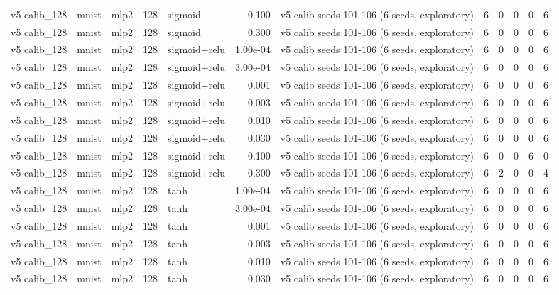 \begin{table}[htbp]
{\begin{tabular}{@{}lllrlrlrrrrr@{}}
v5 calib\_128 & mnist & mlp2 & 128 & sigmoid & 0.100 & v5 calib seeds 101-106 (6 seeds, exploratory) & 6 & 0 & 0 & 0 & 6 \\
v5 calib\_128 & mnist & mlp2 & 128 & sigmoid & 0.300 & v5 calib seeds 101-106 (6 seeds, exploratory) & 6 & 0 & 0 & 0 & 6 \\
v5 calib\_128 & mnist & mlp2 & 128 & sigmoid+relu & 1.00e-04 & v5 calib seeds 101-106 (6 seeds, exploratory) & 6 & 0 & 0 & 0 & 6 \\
v5 calib\_128 & mnist & mlp2 & 128 & sigmoid+relu & 3.00e-04 & v5 calib seeds 101-106 (6 seeds, exploratory) & 6 & 0 & 0 & 0 & 6 \\
v5 calib\_128 & mnist & mlp2 & 128 & sigmoid+relu & 0.001 & v5 calib seeds 101-106 (6 seeds, exploratory) & 6 & 0 & 0 & 0 & 6 \\
v5 calib\_128 & mnist & mlp2 & 128 & sigmoid+relu & 0.003 & v5 calib seeds 101-106 (6 seeds, exploratory) & 6 & 0 & 0 & 0 & 6 \\
v5 calib\_128 & mnist & mlp2 & 128 & sigmoid+relu & 0.010 & v5 calib seeds 101-106 (6 seeds, exploratory) & 6 & 0 & 0 & 0 & 6 \\
v5 calib\_128 & mnist & mlp2 & 128 & sigmoid+relu & 0.030 & v5 calib seeds 101-106 (6 seeds, exploratory) & 6 & 0 & 0 & 0 & 6 \\
v5 calib\_128 & mnist & mlp2 & 128 & sigmoid+relu & 0.100 & v5 calib seeds 101-106 (6 seeds, exploratory) & 6 & 0 & 0 & 6 & 0 \\
v5 calib\_128 & mnist & mlp2 & 128 & sigmoid+relu & 0.300 & v5 calib seeds 101-106 (6 seeds, exploratory) & 6 & 2 & 0 & 0 & 4 \\
v5 calib\_128 & mnist & mlp2 & 128 & tanh & 1.00e-04 & v5 calib seeds 101-106 (6 seeds, exploratory) & 6 & 0 & 0 & 0 & 6 \\
v5 calib\_128 & mnist & mlp2 & 128 & tanh & 3.00e-04 & v5 calib seeds 101-106 (6 seeds, exploratory) & 6 & 0 & 0 & 0 & 6 \\
v5 calib\_128 & mnist & mlp2 & 128 & tanh & 0.001 & v5 calib seeds 101-106 (6 seeds, exploratory) & 6 & 0 & 0 & 0 & 6 \\
v5 calib\_128 & mnist & mlp2 & 128 & tanh & 0.003 & v5 calib seeds 101-106 (6 seeds, exploratory) & 6 & 0 & 0 & 0 & 6 \\
v5 calib\_128 & mnist & mlp2 & 128 & tanh & 0.010 & v5 calib seeds 101-106 (6 seeds, exploratory) & 6 & 0 & 0 & 0 & 6 \\
v5 calib\_128 & mnist & mlp2 & 128 & tanh & 0.030 & v5 calib seeds 101-106 (6 seeds, exploratory) & 6 & 0 & 0 & 0 & 6 \\

\end{tabular}}
\end{table}
